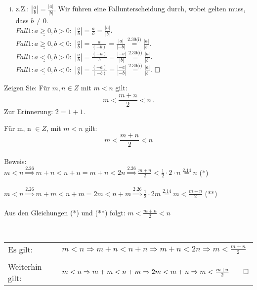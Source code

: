 \begin{lsg}
\begin{enumerate}[i)]
	\item z.Z.: \(|\frac{a}{b}|=\frac{|a|}{|b|}\). Wir führen eine Fallunterscheidung durch, wobei gelten muss, dass \(b\neq0\). \\
		\(\underline{Fall 1: a\geq 0, b> 0:}\) \quad \(|\frac{a}{b}|=\frac{a}{b}=\frac{|a|}{|b|}\). \\
		\(\underline{Fall 1: a\geq 0, b< 0:}\) \quad \(|\frac{a}{b}|=\frac{a}{(-b)}=\frac{|a|}{|-b|}\overset{\text{2.30(i)}}{=} \frac{|a|}{|b|}\). \\
		\(\underline{Fall 1: a< 0, b> 0:}\) \quad \(|\frac{a}{b}|=\frac{(-a)}{b}=\frac{|-a|}{|b|}\overset{\text{2.30(i)}}{=} \frac{|a|}{|b|}\). \\
		\(\underline{Fall 1: a< 0, b< 0:}\) \quad \(|\frac{a}{b}|=\frac{(-a)}{(-b)}=\frac{|-a|}{|-b|}\overset{\text{2.30(i)}}{=} \frac{|a|}{|b|}\). \(\hfill \square\) \\
\end{enumerate}
\end{lsg}

\bigskip



\begin{aufg}[4 Punkte]\label{mittel}
Zeigen Sie: Für $m,n\in Z$ mit $m<n$ gilt:
\[ m<\frac{m+n}{2} < n\,.\]
Zur Erinnerung: $2 = 1+1$.
\end{aufg}
 
\bigskip 
 
\begin{lsg}
Für m, n $ \in Z$, 
mit $m < n$ gilt:
\[m<\frac{m+n}{2}<n\] 
\\ Beweis:
\\ $m<n \overset{2.26}{\Rightarrow} m+n < n+n = m+n < 2n \overset{2.26}{\Rightarrow} \frac{m+n}{2}< \frac{1}{2}\cdot 2 \cdot n \overset{2.14}{=} n $ (*)
\\
\\$ m<n\overset{2.26}{\Rightarrow} m+m < n+m = 2m < n+m \overset{2.26}{\Rightarrow} \frac{1}{2}\cdot2m \overset{2.14}{=} m < \frac{m+n}{2} $ (**)
\\
\\ Aus den Gleichungen (*) und (**) folgt: $m<\frac{m+n}{2}<n$
\end{lsg}

\bigskip

\begin{lsg}[L\"osung~2]
	~\\[2ex]
	\begin{tabular}{ll}
		Es gilt: & $m<n \Rightarrow m+n<n+n \Rightarrow m+n<2n \Rightarrow m< \frac{m+n}{2}$ \\
		&\\
	Weiterhin gilt: & $m<n \Rightarrow m+m < n+m \Rightarrow 2m < m+n \Rightarrow m<\frac{m+n}{2} \qed$\\
	\end{tabular}



\end{lsg}


